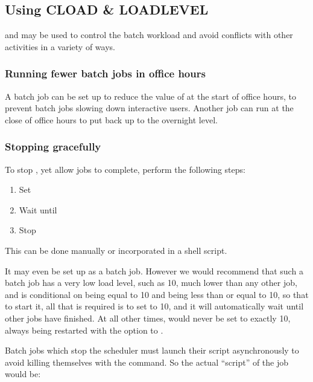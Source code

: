 \subsection{Using CLOAD \& LOADLEVEL}
 and  may be used to control the batch workload and avoid conflicts with other activities in a variety of ways.


\subsubsection{Running fewer batch jobs in office hours}
A batch job can be set up to reduce the value of  at the start of office hours, to prevent
batch jobs slowing down interactive users. Another job can run at the close of office hours to put  back up to
the overnight level.

\subsubsection{Stopping \manualProduct{} gracefully}
To stop \ProductName{}, yet allow jobs to complete, perform the following steps:

\begin{enumerate}
\item Set 
\item Wait until 
\item Stop \ProductName{}
\end{enumerate}
This can be done manually or incorporated in a shell script.

It may even be set up as a batch job. However we would recommend that such a batch job has a very low load level, such as 10, much lower than
any other job, and is conditional on  being equal to 10 and  being less than or
equal to 10, so that to start it, all that is required is to set  to 10, and it will automatically wait
until other jobs have finished. At all other times,  would never be set to exactly 10,
\ProductName{} always being restarted with the  option to \PrBtstart{}.

Batch jobs which stop the scheduler must launch their script asynchronously to avoid killing themselves with the
\PrBtquit{} command. So the actual ``script'' of the job would be:


